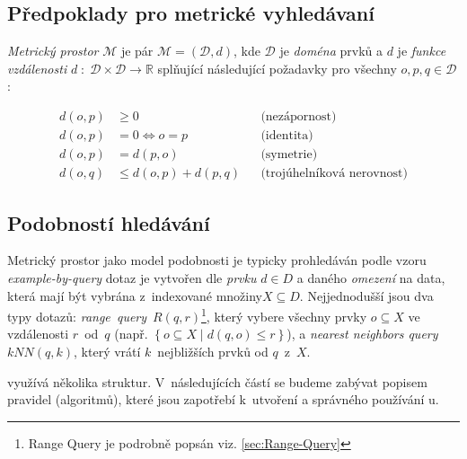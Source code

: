 \subsection{Předpoklady pro metrické vyhledávaní}

\emph{Metrický prostor }$\mathcal{M}$ je pár $\mathcal{M}=(\mathcal{D},d)$,
kde $\mathcal{D}$ je \emph{doména} prvků a $d$ je \emph{funkce vzdálenosti}
$d\;:\;\mathcal{D}\times\mathcal{D}\rightarrow\mathbb{R}$ splňující
následující požadavky pro všechny $o,p,q\in\mathcal{D}$:

\begin{align*}
d(o,p) & \geq0 &  & \textrm{(nezápornost)}\\
d(o,p) & =0\Longleftrightarrow o=p &  & \textrm{(identita)}\\
d(o,p) & =d(p,o) &  & \textrm{(symetrie)}\\
d(o,q) & \leq d(o,p)+d(p,q) &  & \textrm{(trojúhelníková nerovnost)}
\end{align*}



\subsection{Podobností hledávání}

Metrický prostor jako model podobnosti je typicky prohledáván podle
vzoru \emph{example-by-query} \textendash{} dotaz je vytvořen dle
\emph{prvku} $d\in D$ a daného \emph{omezení} na data, která mají
být vybrána z~indexované množiny$X\subseteq D$\@. Nejjednodušší
jsou dva typy dotazů: \emph{range~query}~$R(q,r)$\footnote{Range Query je podrobně popsán viz. \vref{sec:Range-Query}
}, který vybere všechny prvky $o\subseteq X$ ve vzdálenosti $r$~od~$q$
(např. $\left\{ o\subseteq X\mid d(q,o)\leq r\right\} $), a \emph{nearest
neighbors query} $kNN(q,k)$, který vrátí $k$~nejbližších prvků
od $q$~z~$X$\@.

\MIndex{} využívá několika struktur\@. V~následujících částí se budeme
zabývat popisem pravidel (algoritmů), které jsou zapotřebí k~utvoření
a správného používání \MIndex u.
